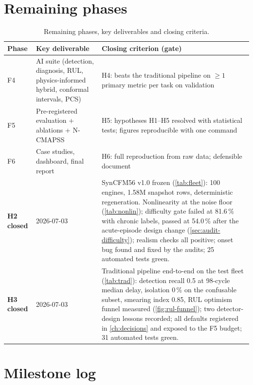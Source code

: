 \section{Remaining phases}

\begin{table}[htbp]
  \centering\small
  \caption{Remaining phases, key deliverables and closing criteria.}
  \label{tab:remaining-phases}
  \begin{tabular}{p{}p{}p{}}
    \toprule
    Phase & Key deliverable & Closing criterion (gate) \\
    \midrule
    F4 & AI suite (detection, diagnosis, RUL, physics-informed hybrid, conformal intervals,
         PCS) &
         H4: beats the traditional pipeline on $\geq1$ primary metric per task on validation \\
    F5 & Pre-registered evaluation + ablations + N-CMAPSS &
         H5: hypotheses H1--H5 resolved with statistical tests; figures reproducible with one
         command \\
    F6 & Case studies, dashboard, final report &
         H6: full reproduction from raw data; defensible document \\
    \textbf{H2 closed} & 2026-07-03 & SynCFM56 v1.0 frozen (\cref{tab:fleet}): 100 engines,
      1.58M snapshot rows, deterministic regeneration. Nonlinearity at the noise floor
      (\cref{tab:nonlin}); difficulty gate failed at 81.6\,\% with chronic labels, passed at
      54.0\,\% after the acute-episode design change (\cref{sec:audit-difficulty}); realism
      checks all positive; onset bug found and fixed by the audits; 25 automated tests green. \\
    \textbf{H3 closed} & 2026-07-03 & Traditional pipeline end-to-end on the test fleet
      (\cref{tab:trad}): detection recall 0.5 at 98-cycle median delay, isolation 0\,\% on
      the confusable subset, smearing index 0.85, RUL optimism funnel measured
      (\cref{fig:rul-funnel}); two detector-design lessons recorded; all defaults registered
      in \cref{ch:decisions} and exposed to the F5 budget; 31 automated tests green. \\
    \bottomrule
  \end{tabular}
\end{table}

\section{Milestone log}

